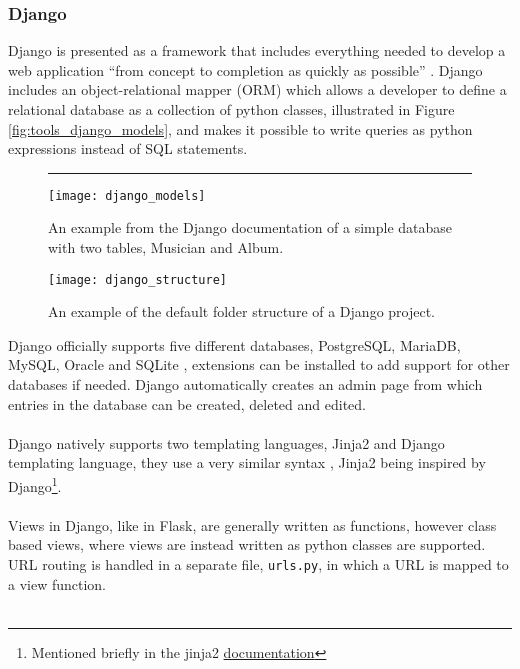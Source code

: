 \subsubsection{Django}
Django is presented as a framework that includes everything needed to develop a web application ``from concept to completion as quickly as possible'' \cite{Django_home}.
Django includes an object-relational mapper (ORM) which allows a developer to define a relational database as a collection of python classes, illustrated in Figure \ref{fig:tools_django_models}, and makes it possible to write queries as python expressions instead of SQL statements. 
\begin{figure}[b!]
\centering
\hrule
\vspace*{0.2cm}
\texttt{[image: django\_models]}
\caption{An example from the Django documentation of a simple database with two tables, Musician and Album.}
\label{fig:tools_django_models}
\texttt{[image: django\_structure]}
\caption{An example of the default folder structure of a Django project.}
\label{fig:tools_django_structure}
\end{figure}
Django officially supports five different databases, PostgreSQL, MariaDB, MySQL, Oracle and SQLite \cite{Django_db}, extensions can be installed to add support for other databases if needed. Django automatically creates an admin page from which entries in the database can be created, deleted and edited.\\\\
Django natively supports two templating languages, Jinja2 and Django templating language, they use a very similar syntax \cite{DTL_to_jinja}, Jinja2 being inspired by Django\footnote{Mentioned briefly in the jinja2 \href{https://jinja.palletsprojects.com/en/3.1.x/templates/}{documentation}}.\\\\
Views in Django, like in Flask, are generally written as functions, however class based views, where views are instead written as python classes are supported. URL routing is handled in a separate file, \verb|urls.py|, in which a URL is mapped to a view function.\\\\
